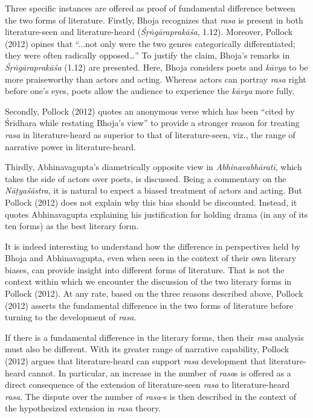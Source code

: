 Three specific instances are offered as proof of fundamental difference between the two forms of literature. Firstly, Bhoja recognizes that \textsl{rasa} is present in both literature-seen and literature-heard (\textsl{Śṛṅgāraprakāśa}, 1.12). Moreover, Pollock (2012) opines that “...not only were the two genres categorically differentiated; they were often radically opposed…” To justify the claim, Bhoja’s remarks in \textsl{Śṛṅgāraprakāśa} (1.12) are presented. Here, Bhoja considers poets and \textsl{kāvya }to be more praiseworthy than actors and acting. Whereas actors can portray \textsl{rasa} right before one’s eyes, poets allow the audience to experience the \textsl{kāvya }more fully. 

Secondly, Pollock (2012) quotes an anonymous verse which has been “cited by Śrīdhara while restating Bhoja’s view” to provide a stronger reason for treating \textsl{rasa} in literature-heard as superior to that of literature-seen, viz., the range of narrative power in literature-heard. 

Thirdly, Abhinavagupta’s diametrically opposite view in \textsl{Abhinavabhāratī}, which takes the side of actors over poets, is discussed. Being a commentary on the \textsl{Nāṭyaśāstra}, it is natural to expect a biased treatment of actors and acting. But Pollock (2012) does not explain why this bias should be discounted. Instead, it quotes Abhinavagupta explaining his justification for holding drama (in any of its ten forms) as the best literary form. 

It is indeed interesting to understand how the difference in perspectives held by Bhoja and Abhinavagupta, even when seen in the context of their own literary biases, can provide insight into different forms of literature. That is not the context within which we encounter the discussion of the two literary forms in Pollock (2012). At any rate, based on the three reasons described above, Pollock (2012) asserts the fundamental difference in the two forms of literature before turning to the development of \textsl{rasa}. 

If there is a fundamental difference in the literary forms, then their \textsl{rasa} analysis must also be different. With its greater range of narrative capability, Pollock (2012) argues that literature-heard can support \textsl{rasa} development that literature-heard cannot. In particular, an increase in the number of \textsl{rasa}s is offered as a direct consequence of the extension of literature-seen \textsl{rasa }to literature-heard \textsl{rasa}. The dispute over the number of \textsl{rasa}-s is then described in the context of the hypothesized extension in \textsl{rasa} theory.

